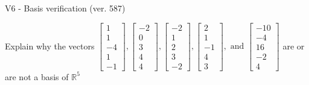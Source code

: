 \begin{exercise}
  \begin{exerciseTitle}V6 - Basis verification (ver. 587)\end{exerciseTitle}
  \begin{exerciseStatement}
    Explain why the vectors \(\left[\begin{array}{r}
1 \\
1 \\
-4 \\
1 \\
-1
\end{array}\right] , \left[\begin{array}{r}
-2 \\
0 \\
3 \\
4 \\
4
\end{array}\right] , \left[\begin{array}{r}
-2 \\
1 \\
2 \\
3 \\
-2
\end{array}\right] , \left[\begin{array}{r}
2 \\
1 \\
-1 \\
4 \\
3
\end{array}\right] , \text{ and } \left[\begin{array}{r}
-10 \\
-4 \\
16 \\
-2 \\
4
\end{array}\right]\) are or are not a basis of \(\mathbb{R}^5\)	



\end{exerciseStatement}
\end{exercise}

